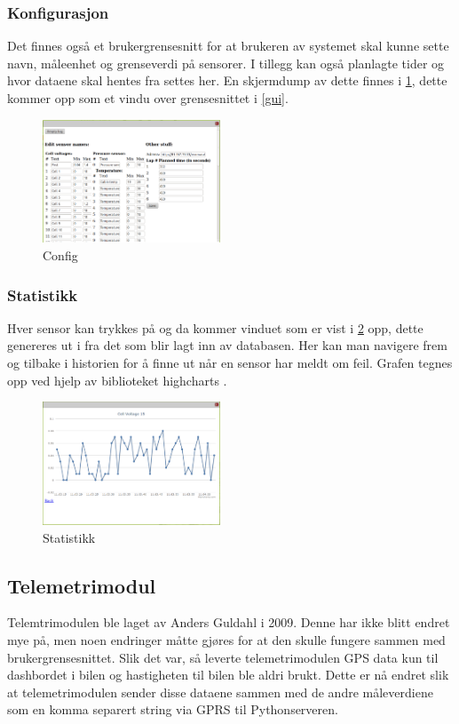\subsubsection{Konfigurasjon}
Det finnes også et brukergrensesnitt for at brukeren av systemet skal kunne sette navn, måleenhet og grenseverdi på sensorer. I tillegg kan også planlagte tider og hvor dataene skal hentes fra settes her.
En skjermdump av dette finnes i \ref{config}, dette kommer opp som et vindu over grensesnittet i \ref{gui}.
\begin{figure}[H]
\label{config}
\includegraphics[width=200px]{images/config.png}
\caption{Config} 
\end{figure}

\subsubsection{Statistikk}
Hver sensor kan trykkes på og da kommer vinduet som er vist i \ref{stats} opp, dette genereres ut i fra det som blir lagt inn av databasen. Her kan man navigere frem og tilbake i historien for å finne ut når en sensor har meldt om feil. Grafen tegnes opp ved hjelp av biblioteket highcharts \cite{highcharts}.
\begin{figure}[H]
\label{stats}
\includegraphics[width=200px]{images/stat.png}
\caption{Statistikk} 
\end{figure}
\subsection{Telemetrimodul}
Telemtrimodulen ble laget av Anders Guldahl \cite{telemetrithesis} i 2009. Denne har ikke blitt endret mye på, men noen endringer måtte gjøres for at den skulle fungere sammen med brukergrensesnittet.
Slik det var, så leverte telemetrimodulen GPS data kun til dashbordet i bilen og hastigheten til bilen ble aldri brukt. Dette er nå endret slik at telemetrimodulen sender disse dataene sammen med de andre måleverdiene som en komma separert string via GPRS til Pythonserveren.
